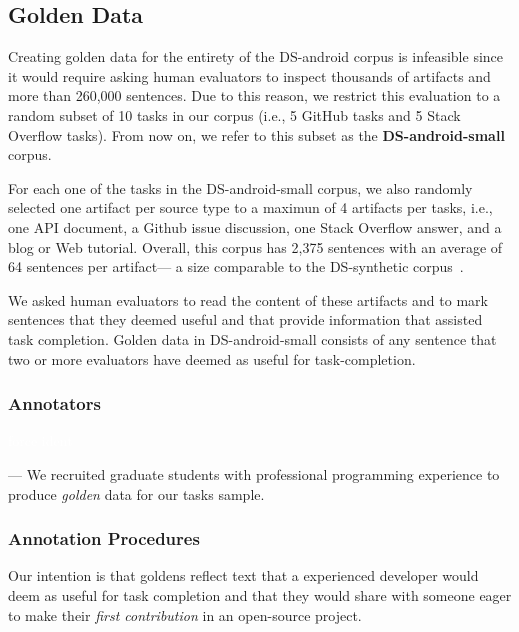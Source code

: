 \subsection{Golden Data}


Creating golden data for the entirety of the \acs{DS-android} corpus is infeasible
since it would require asking human evaluators to inspect thousands of artifacts and more than 260,000 sentences.
Due to this reason, we restrict this evaluation to a random subset of 10 tasks in our corpus (i.e., 5 GitHub tasks and 5 Stack Overflow tasks). 
From now on, we refer to this subset as the \textbf{\acs{DS-android-small}} corpus.


For each one of the tasks in the \acs{DS-android-small} corpus, we also randomly selected 
one artifact per source type to a maximun of 4 artifacts per tasks, i.e., one API document, a Github issue discussion, one Stack Overflow answer, and a blog or Web tutorial.
Overall, this corpus has 2,375 sentences with an average of 64 sentences per artifact---
a size comparable to the \acs{DS-synthetic} corpus~\cite{marques2020}.


We asked human evaluators to read the content of these artifacts and 
to mark sentences that they deemed useful and that provide information that assisted task completion.
Golden data in \acs{DS-android-small} consists of any sentence that two or more evaluators have deemed as useful for task-completion.



\subsubsection{Annotators}
\textcolor{white}{force ident} %

--- We recruited  graduate students with professional programming experience to produce \textit{golden} data for our tasks sample. \vspace{3mm}


\subsubsection{Annotation Procedures}

Our intention is that goldens reflect text that a experienced developer would deem as useful for task completion and that they would share with someone eager to make their \textit{first contribution} in an open-source project.


